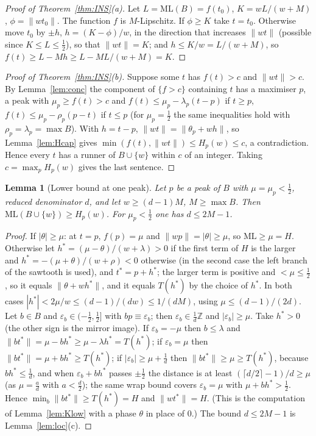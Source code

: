 \documentclass[11pt]{article}
\newtheorem{lemma}[theorem]{Lemma}
\theoremstyle{definition}
\theoremstyle{remark}
\newcommand{\nd}[1]{\lVert #1\rVert}
\newcommand{\ML}{\mathrm{ML}}
\newcommand{\ZZ}{\mathbb{Z}}
\begin{document}
\begin{proof}[Proof of Theorem~\ref{thm:INS}(a)]
Let $L=\ML(B)=f(t_0)$, $K=wL/(w+M)$, $\phi=\nd{wt_0}$. The function $f$ is $M$-Lipschitz. If $\phi\ge K$ take $t=t_0$. Otherwise move $t_0$ by $\pm h$, $h=(K-\phi)/w$, in the direction that increases $\nd{wt}$ (possible since $K\le L\le\frac12$), so that $\nd{wt}=K$; and $h\le K/w=L/(w+M)$, so $f(t)\ge L-Mh\ge L-ML/(w+M)=K$.
\end{proof}

\begin{proof}[Proof of Theorem~\ref{thm:INS}(b)]
Suppose some $t$ has $f(t)>c$ and $\nd{wt}>c$. By Lemma~\ref{lem:conc} the component of $\{f>c\}$ containing $t$ has a maximiser $p$, a peak with $\mu_p\ge f(t)>c$ and $f(t)\le\mu_p-\lambda_p(t-p)$ if $t\ge p$, $f(t)\le\mu_p-\rho_p(p-t)$ if $t\le p$ (for $\mu_p=\frac12$ the same inequalities hold with $\rho_p=\lambda_p=\max B$). With $h=t-p$, $\nd{wt}=\nd{\theta_p+wh}$, so Lemma~\ref{lem:Hcap} gives $\min(f(t),\nd{wt})\le H_p(w)\le c$, a contradiction. Hence every $t$ has a runner of $B\cup\{w\}$ within $c$ of an integer. Taking $c=\max_pH_p(w)$ gives the last sentence.
\end{proof}

\begin{lemma}[Lower bound at one peak]\label{lem:peakL}
Let $p$ be a peak of $B$ with $\mu=\mu_p<\frac12$, reduced denominator $d$, and let $w\ge(d-1)M$, $M\ge\max B$. Then $\ML(B\cup\{w\})\ge H_p(w)$. For $\mu_p<\frac12$ one has $d\le2M-1$.
\end{lemma}
\begin{proof}
If $|\theta|\ge\mu$: at $t=p$, $f(p)=\mu$ and $\nd{wp}=|\theta|\ge\mu$, so $\ML\ge\mu=H$. Otherwise let $h^*=(\mu-\theta)/(w+\lambda)>0$ if the first term of $H$ is the larger and $h^*=-(\mu+\theta)/(w+\rho)<0$ otherwise (in the second case the left branch of the sawtooth is used), and $t^*=p+h^*$; the larger term is positive and $<\mu\le\frac12$, so it equals $\nd{\theta+wh^*}$, and it equals $T(h^*)$ by the choice of $h^*$. In both cases $|h^*|<2\mu/w\le(d-1)/(dw)\le1/(dM)$, using $\mu\le(d-1)/(2d)$. Let $b\in B$ and $\varepsilon_b\in(-\frac12,\frac12]$ with $bp\equiv\varepsilon_b$; then $\varepsilon_b\in\frac1d\ZZ$ and $|\varepsilon_b|\ge\mu$. Take $h^*>0$ (the other sign is the mirror image). If $\varepsilon_b=-\mu$ then $b\le\lambda$ and $\nd{bt^*}=\mu-bh^*\ge\mu-\lambda h^*=T(h^*)$; if $\varepsilon_b=\mu$ then $\nd{bt^*}=\mu+bh^*\ge T(h^*)$; if $|\varepsilon_b|\ge\mu+\frac1d$ then $\nd{bt^*}\ge\mu\ge T(h^*)$, because $bh^*\le\frac1d$, and when $\varepsilon_b+bh^*$ passes $\pm\frac12$ the distance is at least $(\lceil d/2\rceil-1)/d\ge\mu$ (as $\mu=\frac ad$ with $a<\frac d2$); the same wrap bound covers $\varepsilon_b=\mu$ with $\mu+bh^*>\frac12$. Hence $\min_{b}\nd{bt^*}\ge T(h^*)=H$ and $\nd{wt^*}=H$. (This is the computation of Lemma~\ref{lem:Klow} with a phase $\theta$ in place of $0$.) The bound $d\le2M-1$ is Lemma~\ref{lem:loc}(c).
\end{proof}
\end{document}
